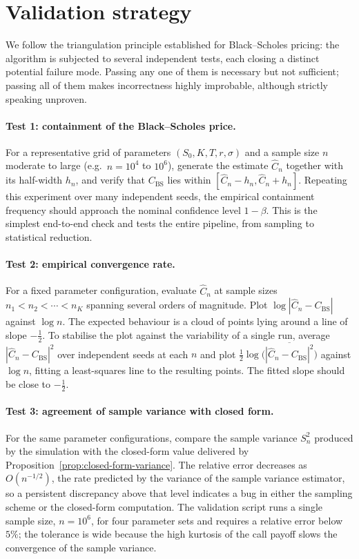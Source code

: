 \documentclass[11pt,a4paper]{article}
\theoremstyle{plain}
\theoremstyle{definition}
\theoremstyle{remark}
\begin{document}
\section{Validation strategy}
\label{sec:validation}

We follow the triangulation principle established for Black--Scholes
pricing: the
algorithm is subjected to several independent tests, each closing a
distinct potential failure mode. Passing any one of them is necessary
but not sufficient; passing all of them makes incorrectness highly
improbable, although strictly speaking unproven.

\paragraph{Test 1: containment of the Black--Scholes price.}
For a representative grid of parameters $(S_0, K, T, r, \sigma)$ and a
sample size $n$ moderate to large (e.g.\ $n = 10^4$ to $10^6$),
generate the estimate $\hat{C}_n$ together with its half-width $h_n$,
and verify that $C_{\mathrm{BS}}$ lies within
$[\hat{C}_n - h_n, \hat{C}_n + h_n]$. Repeating this experiment over
many independent seeds, the empirical containment frequency should
approach the nominal confidence level $1 - \beta$. This is the simplest
end-to-end check and tests the entire pipeline, from sampling to
statistical reduction.

\paragraph{Test 2: empirical convergence rate.}
For a fixed parameter configuration, evaluate $\hat{C}_n$ at sample
sizes $n_1 < n_2 < \cdots < n_K$ spanning several orders of magnitude.
Plot $\log |\hat{C}_n - C_{\mathrm{BS}}|$ against $\log n$. The
expected behaviour is a cloud of points lying around a line of slope
$-\tfrac{1}{2}$. To stabilise the plot against the variability of a
single run, average $|\hat{C}_n - C_{\mathrm{BS}}|^2$ over independent
seeds at each $n$ and plot
$\tfrac{1}{2}\log\!\big(\overline{|\hat{C}_n - C_{\mathrm{BS}}|^2}\big)$
against $\log n$, fitting a least-squares line to the resulting points.
The fitted slope should be close to $-\tfrac{1}{2}$.

\paragraph{Test 3: agreement of sample variance with closed form.}
For the same parameter configurations, compare the sample variance
$S_n^2$ produced by the simulation with the closed-form value
delivered by Proposition~\ref{prop:closed-form-variance}. The relative
error decreases as $O(n^{-1/2})$, the rate predicted by the variance of
the sample variance estimator, so a persistent discrepancy above that
level indicates a bug in either the sampling scheme or the closed-form
computation. The validation script runs a single sample size,
$n = 10^6$, for four parameter sets and requires a relative error below
$5\%$; the tolerance is wide because the high kurtosis of the call
payoff slows the convergence of the sample variance.
\end{document}
